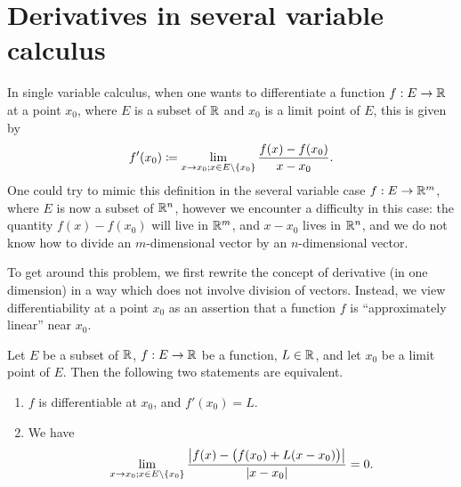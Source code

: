\section{Derivatives in several variable calculus}\label{sec:6.2}

\begin{note}
  In single variable calculus, when one wants to differentiate a function \(f : E \to \mathbb{R}\) at a point \(x_0\), where \(E\) is a subset of \(\mathbb{R}\) and \(x_0\) is a limit point of \(E\), this is given by
  \[
    f'(x_0) \coloneqq \lim_{x \to x_0 ; x \in E \setminus \left\lbrace x_0\right\rbrace} \dfrac{f(x) - f(x_0)}{x - x_0}.
  \]
  One could try to mimic this definition in the several variable case \(f : E \to \mathbb{R}^m\), where \(E\) is now a subset of \(\mathbb{R}^n\), however we encounter a difficulty in this case:
  the quantity \(f(x) - f(x_0)\) will live in \(\mathbb{R}^m\), and \(x - x_0\) lives in \(\mathbb{R}^n\), and we do not know how to divide an \(m\)-dimensional vector by an \(n\)-dimensional vector.

  To get around this problem, we first rewrite the concept of derivative (in one dimension) in a way which does not involve division of vectors.
  Instead, we view differentiability at a point \(x_0\) as an assertion that a function \(f\) is ``approximately linear'' near \(x_0\).
\end{note}

\begin{lem}\label{6.2.1}
  Let \(E\) be a subset of \(\mathbb{R}\), \(f : E \to \mathbb{R}\) be a function, \(L \in \mathbb{R}\), and let \(x_0\) be a limit point of \(E\).
  Then the following two statements are equivalent.
  \begin{enumerate}
    \item \(f\) is differentiable at \(x_0\), and \(f'(x_0) = L\).
    \item We have
          \[
            \lim_{x \to x_0 ; x \in E \setminus \left\lbrace x_0\right\rbrace} \dfrac{\left\lvert f(x) - \big(f(x_0) + L (x - x_0)\big)\right\rvert}{\left\lvert x - x_0\right\rvert} = 0.
          \]
  \end{enumerate}
\end{lem}

